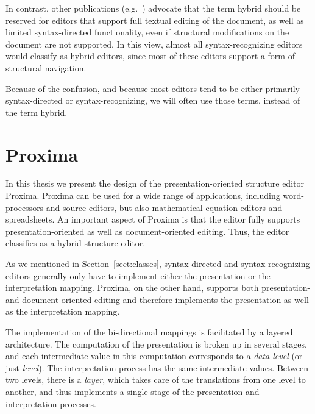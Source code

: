 In contrast, other publications (e.g.~\cite{ballance92pan, koorn92gse}) advocate that the term hybrid should be reserved for editors that support full textual editing of the document, as well as limited syntax-directed functionality, even if structural modifications on the document are not supported. In this view, almost all syntax-recognizing editors would classify as hybrid editors, since most of these editors support a form of structural navigation.

Because of the confusion, and because most editors tend to be either primarily syntax-directed or syntax-recognizing, we will often use those terms, instead of the term hybrid.



\section{Proxima} \label{sect:introProxima}

In this thesis we present the design of the presentation-oriented structure editor Proxima. Proxima can be used for a wide range of applications, including word-processors and source editors, but also mathematical-equation editors and spreadsheets. An important aspect of Proxima is that the editor fully supports presentation-oriented as well as document-oriented editing. Thus, the editor classifies as a hybrid structure editor.

As we mentioned in Section~\ref{sect:classes},  syntax-directed and syntax-recognizing editors generally only have to implement either the presentation or the interpretation mapping. Proxima, on the other hand, supports both  presentation- and document-oriented editing and therefore implements the presentation as well as  the interpretation mapping. 

The implementation of the bi-directional mappings is facilitated by a layered architecture. The computation of the presentation is broken up in several stages, and each intermediate value in this computation corresponds to a {\em data level} (or just {\em level}). The interpretation process has the same intermediate values. Between two levels, there is a {\em layer}, which takes care of the translations from one level to another, and thus implements a single stage of the presentation and interpretation processes.

